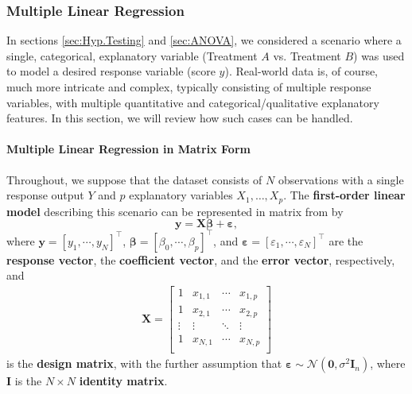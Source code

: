 
\subsubsection{Multiple Linear Regression}\label{sec:MLR}
In sections \ref{sec:Hyp.Testing} and \ref{sec:ANOVA}, we considered a scenario where a single, categorical, explanatory variable (Treatment $A$ vs. Treatment $B$) was used to model a desired response variable (score $y$). Real-world data is, of course, much more intricate and complex, typically consisting of multiple response variables, with multiple quantitative and categorical/qualitative explanatory features. In this section, we will review how such cases can be handled.

\paragraph{Multiple Linear Regression in Matrix Form}
Throughout, we suppose that the dataset consists of $N$ observations with a single response output $Y$ and $p$ explanatory variables $X_1,\ldots,X_p$. The \textbf{first-order linear model} describing this scenario can be represented in matrix from by 
\begin{equation}\label{eq:MLR}
    \bm{y}=\bm{X\beta}+\bm{\varepsilon},
\end{equation}
where $\bm{y}=[y_{1},\cdots,y_{N}]^{\!\top}$, $\bm{\beta}=[\beta_{0},\cdots,\beta_{p}]^{\!\top}$, and $\bm{\varepsilon}=[\varepsilon_{1},\cdots,\varepsilon_{N}]^{\!\top}$ are the \textbf{response vector},  the \textbf{coefficient vector}, and  the \textbf{error vector}, respectively, and 
\begin{gather*}
 \bm{X} =  
    \begin{bmatrix}
    1 & x_{1,1} & \cdots & x_{1,p}\\
    1 & x_{2,1} & \cdots & x_{2,p}\\
    \vdots & \vdots & \ddots & \vdots\\
    1 & x_{N,1} & \cdots & x_{N,p}\\
    \end{bmatrix}  
\end{gather*}
is the \textbf{design matrix}, with the further assumption that $\bm{\varepsilon}\sim \mathcal{N}(\bm{0}, \sigma^{2}\bm{I}_n)$, where $\bm{I}$ is the $N \times N$ \textbf{identity matrix}. 

